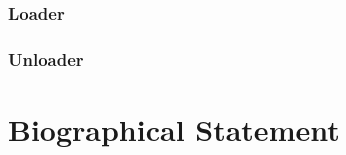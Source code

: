 \documentclass[12pt, oneside]{book}
\begin{document}

\subsection{Loader}
\label{Step 0: Loader}


\subsection{Unloader}
\label{Step 0: Unloader}



\appendix

\backmatter




\chapter{Biographical Statement}

\end{document}
